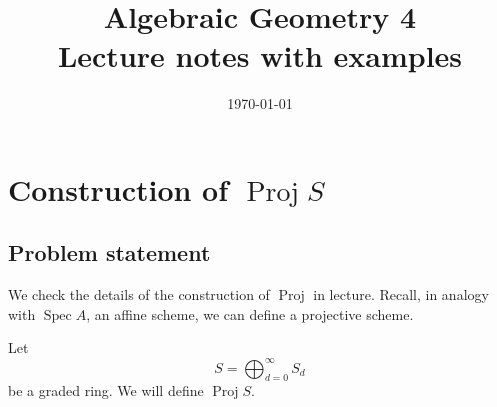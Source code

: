 \documentclass[12pt,a4paper]{article}
\title{\bfseries Algebraic Geometry 4\\


\large Lecture notes with examples}
\author{}
\date{\today}
\DeclareMathOperator{\Spec}{Spec}
\DeclareMathOperator{\Proj}{Proj}
\theoremstyle{notespace}
\begin{document}
\maketitle
\tableofcontents
\clearpage
\section{Construction of \texorpdfstring{$\Proj S$}{Proj S}}

\subsection*{Problem statement}

We check the details of the construction of \(\Proj\) in lecture. Recall, in analogy with
\(\Spec A\), an affine scheme, we can define a projective scheme.

Let
\[
S=\bigoplus_{d=0}^{\infty}S_d
\]
be a graded ring. We will define \(\Proj S\).
\end{document}
